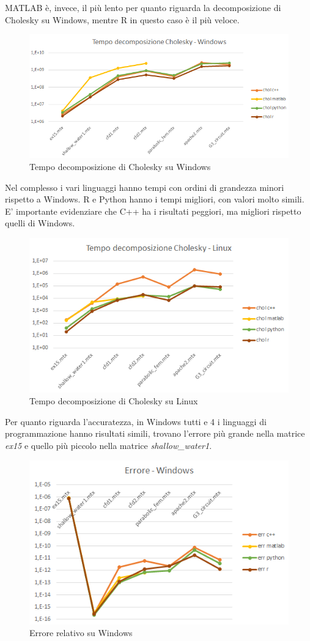 \documentclass[a4paper,12pt]{article}
\begin{document}
\noindent MATLAB è, invece, il più lento per quanto riguarda la decomposizione di Cholesky su Windows, mentre R in questo caso è il più veloce.
\bigskip

\begin{figure}[H]
\centering
  \includegraphics[width=0.8\linewidth]{img/tempocholwin.png}
\caption{Tempo decomposizione di Cholesky su Windows}
\end{figure}

\noindent Nel complesso i vari linguaggi hanno tempi con ordini di grandezza minori  rispetto a Windows. R e Python hanno i tempi migliori, con valori molto simili. E' importante evidenziare che C++ ha i risultati peggiori, ma migliori rispetto quelli di Windows.

\begin{figure}[H]
\centering
  \includegraphics[width=0.75\linewidth]{img/tempochollinux.png}
\caption{Tempo decomposizione di Cholesky su Linux}
\end{figure}


\noindent Per quanto riguarda l'accuratezza, in Windows tutti e 4 i linguaggi di programmazione hanno risultati simili, trovano l'errore più grande nella matrice \textit{ex15} e quello più piccolo nella matrice \textit{shallow\_water1}.
\bigskip

\begin{figure}[H]
\centering
  \includegraphics[width=0.75\linewidth]{img/errwin.png}
\caption{Errore relativo su Windows}
\end{figure}
\end{document}
